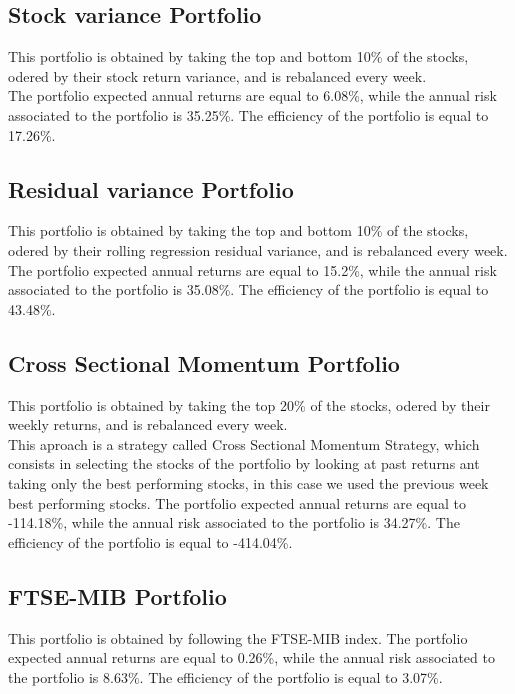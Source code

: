 \documentclass[12pt, a4paper, twocolumn]{article} %
\begin{document}
	\subsection{Stock variance Portfolio}
	This portfolio is obtained by taking the top and bottom 10\% of the stocks, odered by their stock return variance, and is rebalanced every week.\\
	The portfolio expected annual returns are equal to 6.08\%, while the annual risk associated to the portfolio is 35.25\%. The efficiency of the portfolio is equal to 17.26\%.
	\subsection{Residual variance Portfolio}
	This portfolio is obtained by taking the top and bottom 10\% of the stocks, odered by their rolling regression residual variance, and is rebalanced every week.\\
	The portfolio expected annual returns are equal to 15.2\%, while the annual risk associated to the portfolio is 35.08\%. The efficiency of the portfolio is equal to 43.48\%.
	\subsection{Cross Sectional Momentum Portfolio}
	This portfolio is obtained by taking the top 20\% of the stocks, odered by their weekly returns, and is rebalanced every week.\\
	This aproach is a strategy called Cross Sectional Momentum Strategy, which consists in selecting the stocks of the portfolio by looking at past returns ant taking only the best performing stocks, in this case we used the previous week best performing stocks.
	The portfolio expected annual returns are equal to -114.18\%, while the annual risk associated to the portfolio is 34.27\%. The efficiency of the portfolio is equal to -414.04\%.
	\subsection{FTSE-MIB Portfolio}
	This portfolio is obtained by following the FTSE-MIB index.
	The portfolio expected annual returns are equal to 0.26\%, while the annual risk associated to the portfolio is 8.63\%. The efficiency of the portfolio is equal to 3.07\%.
	
\end{document}
